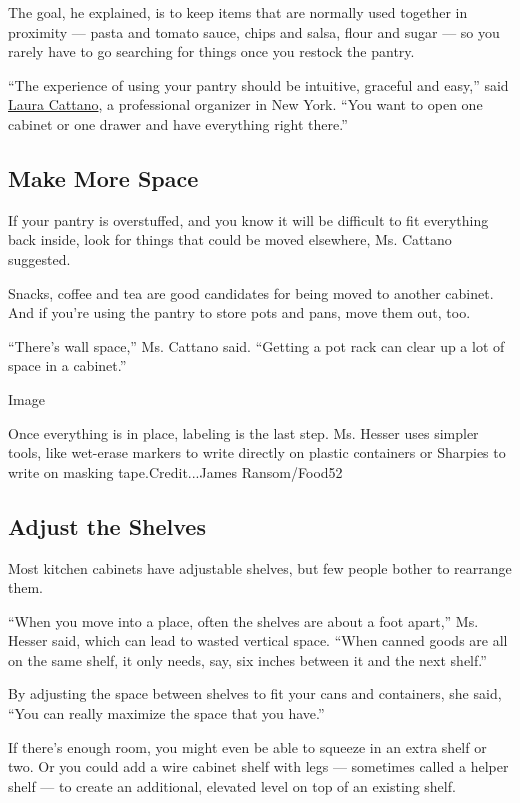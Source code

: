 The goal, he explained, is to keep items that are normally used together
in proximity --- pasta and tomato sauce, chips and salsa, flour and
sugar --- so you rarely have to go searching for things once you restock
the pantry.

``The experience of using your pantry should be intuitive, graceful and
easy,'' said \href{https://lauracattano.com/}{Laura Cattano}, a
professional organizer in New York. ``You want to open one cabinet or
one drawer and have everything right there.''

\hypertarget{make-more-space}{%
\subsection{Make More Space}\label{make-more-space}}

If your pantry is overstuffed, and you know it will be difficult to fit
everything back inside, look for things that could be moved elsewhere,
Ms. Cattano suggested.

Snacks, coffee and tea are good candidates for being moved to another
cabinet. And if you're using the pantry to store pots and pans, move
them out, too.

``There's wall space,'' Ms. Cattano said. ``Getting a pot rack can clear
up a lot of space in a cabinet.''

Image

Once everything is in place, labeling is the last step. Ms. Hesser uses
simpler tools, like wet-erase markers to write directly on plastic
containers or Sharpies to write on masking tape.Credit...James
Ransom/Food52

\hypertarget{adjust-the-shelves}{%
\subsection{Adjust the Shelves}\label{adjust-the-shelves}}

Most kitchen cabinets have adjustable shelves, but few people bother to
rearrange them.

``When you move into a place, often the shelves are about a foot
apart,'' Ms. Hesser said, which can lead to wasted vertical space.
``When canned goods are all on the same shelf, it only needs, say, six
inches between it and the next shelf.''

By adjusting the space between shelves to fit your cans and containers,
she said, ``You can really maximize the space that you have.''

If there's enough room, you might even be able to squeeze in an extra
shelf or two. Or you could add a wire cabinet shelf with legs ---
sometimes called a helper shelf --- to create an additional, elevated
level on top of an existing shelf.

